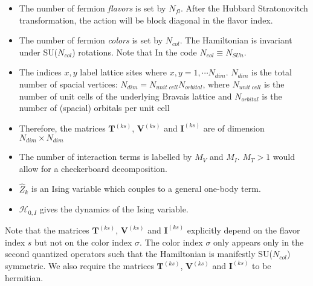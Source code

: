 \begin{itemize}
\item The number of fermion \textit{flavors} is set by $N_{fl}$.  After the Hubbard Stratonovitch transformation, the action will be block diagonal in the flavor index. 
\item The number of fermion \textit{colors} is set by $N_{col}$.    The Hamiltonian is invariant under  SU($N_{col}$)  rotations. Note that  In the code $ N_{col} \equiv N_{SUn} $. 
\item The indices $x,y$ label lattice sites where $x,y=1,\cdots N_{dim}$. 
$N_{dim}$ is the total number of spacial vertices: $N_{dim}=N_{unit\;cell} N_{orbital}$, where $N_{unit\;cell}$ is the number of unit cells of the underlying Bravais lattice and $N_{orbital}$ is the number of (spacial) orbitals per unit cell  
\item Therefore, the  matrices $\bm{T}^{(k s)}$, $\bm{V}^{(ks)}$  and $\bm{I}^{(ks)}$ are  of dimension $N_{dim}\times N_{dim}$
\item The number of interaction terms  is labelled by $M_V$   and $M_I$.   $M_T> 1 $ would allow for a checkerboard decomposition. 
\item $\hat{Z}_k$ is an Ising variable which couples to a general one-body term. 
\item  $\mathcal{H}_{0,I}$  gives the dynamics of the Ising variable. 
\end{itemize}
Note that the matrices  $\bm{T}^{(ks)}$,  $\bm{V}^{(ks)}$ and  $\bm{I}^{(ks)}$ explicitly depend on the flavor index $s$ but not on the color index $\sigma$. 
The color index $\sigma$ only appears only in  the  second quantized operators such that the Hamiltonian is manifestly SU($N_{col}$)    symmetric.  We also require
the matrices $\bm{T}^{(ks)}$,  $\bm{V}^{(ks)}$ and  $\bm{I}^{(ks)}$  to be  hermitian. 


